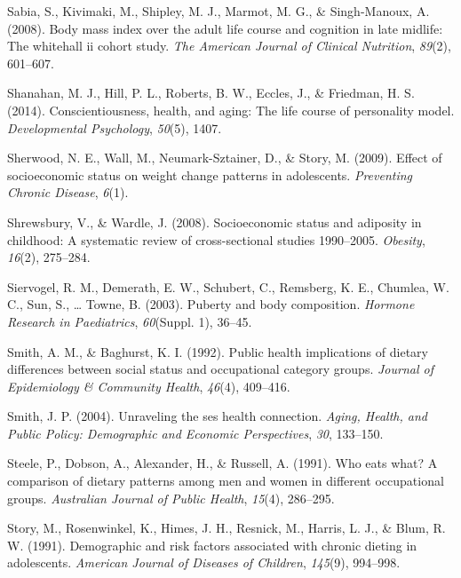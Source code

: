 \documentclass[man]{apa6}
\begin{document}
\leavevmode\hypertarget{ref-sabia2008body}{}%
Sabia, S., Kivimaki, M., Shipley, M. J., Marmot, M. G., \& Singh-Manoux, A. (2008). Body mass index over the adult life course and cognition in late midlife: The whitehall ii cohort study. \emph{The American Journal of Clinical Nutrition}, \emph{89}(2), 601--607.

\leavevmode\hypertarget{ref-shanahan2014conscientiousness}{}%
Shanahan, M. J., Hill, P. L., Roberts, B. W., Eccles, J., \& Friedman, H. S. (2014). Conscientiousness, health, and aging: The life course of personality model. \emph{Developmental Psychology}, \emph{50}(5), 1407.

\leavevmode\hypertarget{ref-neumarkeffect}{}%
Sherwood, N. E., Wall, M., Neumark-Sztainer, D., \& Story, M. (2009). Effect of socioeconomic status on weight change patterns in adolescents. \emph{Preventing Chronic Disease}, \emph{6}(1).

\leavevmode\hypertarget{ref-shrewsbury2008socioeconomic}{}%
Shrewsbury, V., \& Wardle, J. (2008). Socioeconomic status and adiposity in childhood: A systematic review of cross-sectional studies 1990--2005. \emph{Obesity}, \emph{16}(2), 275--284.

\leavevmode\hypertarget{ref-siervogel2003puberty}{}%
Siervogel, R. M., Demerath, E. W., Schubert, C., Remsberg, K. E., Chumlea, W. C., Sun, S., \ldots{} Towne, B. (2003). Puberty and body composition. \emph{Hormone Research in Paediatrics}, \emph{60}(Suppl. 1), 36--45.

\leavevmode\hypertarget{ref-smith1992public}{}%
Smith, A. M., \& Baghurst, K. I. (1992). Public health implications of dietary differences between social status and occupational category groups. \emph{Journal of Epidemiology \& Community Health}, \emph{46}(4), 409--416.

\leavevmode\hypertarget{ref-smiith2004}{}%
Smith, J. P. (2004). Unraveling the ses health connection. \emph{Aging, Health, and Public Policy: Demographic and Economic Perspectives}, \emph{30}, 133--150.

\leavevmode\hypertarget{ref-steele1991eats}{}%
Steele, P., Dobson, A., Alexander, H., \& Russell, A. (1991). Who eats what? A comparison of dietary patterns among men and women in different occupational groups. \emph{Australian Journal of Public Health}, \emph{15}(4), 286--295.

\leavevmode\hypertarget{ref-story1991demographic}{}%
Story, M., Rosenwinkel, K., Himes, J. H., Resnick, M., Harris, L. J., \& Blum, R. W. (1991). Demographic and risk factors associated with chronic dieting in adolescents. \emph{American Journal of Diseases of Children}, \emph{145}(9), 994--998.
\end{document}
